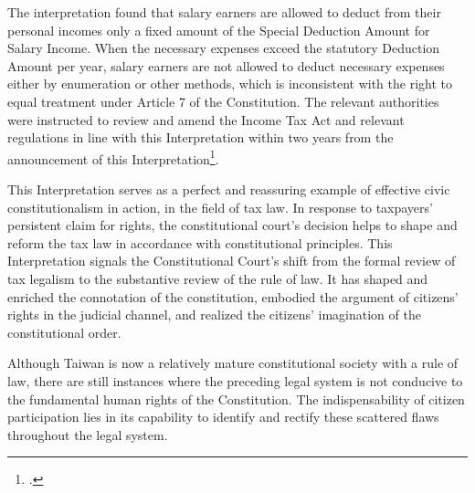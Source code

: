 \documentclass[]{article}
\begin{document}
The interpretation found that salary earners are allowed to deduct from their personal incomes only a fixed amount of the Special Deduction Amount for Salary Income. When the necessary expenses exceed the statutory Deduction Amount per year, salary earners are not allowed to deduct necessary expenses either by enumeration or other methods, which is inconsistent with the right to equal treatment under Article 7 of the Constitution. The relevant authorities were instructed to review and amend the Income Tax Act and relevant regulations in line with this Interpretation within two years from the announcement of this Interpretation\footcite{zotero-175}.


This Interpretation serves as a perfect and reassuring example of effective civic constitutionalism in action, in the field of tax law. In response to taxpayers' persistent claim for rights, the constitutional court's decision helps to shape and reform the tax law in accordance with constitutional principles. This Interpretation signals the Constitutional Court's shift from the formal review of tax legalism to the substantive review of the rule of law. It has shaped and enriched the connotation of the constitution, embodied the argument of citizens' rights in the judicial channel, and realized the citizens' imagination of the constitutional order.

Although Taiwan is now a relatively mature constitutional society with a rule of law, there are still instances where the preceding legal system is not conducive to the fundamental human rights of the Constitution. The indispensability of citizen participation lies in its capability to identify and rectify these scattered flaws throughout the legal system.



\end{document}
